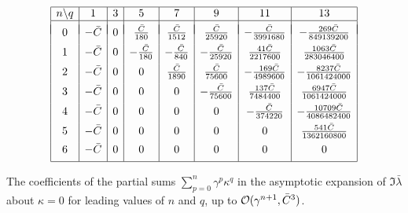 \documentclass[12pt,a5paper]{article}
\begin{document}
\begin{table}
\centering
\[
\begin{array}{|c|c|c|c|c|c|c|c|}
\hline
n\backslash q & 1 & 3 & 5 & 7 & 9 & 11 & 13\\
\hline
&&&&&&&\\[-2ex]
0 & -\bar{C} & 0 & \frac{\bar{C}}{180} & \frac{\bar{C}}{1512} & \frac{\bar{C}}{25920}
   & -\frac{\bar{C}}{3991680} & -\frac{269\bar{C}}{849139200}
\\[1ex]
1 & -\bar{C} & 0 & -\frac{\bar{C}}{180} & -\frac{\bar{C}}{840} & -\frac{\bar{C}}{25920}
   & \frac{41\bar{C}}{2217600} & \frac{1063\bar{C}}{283046400}
\\[1ex]
2 & -\bar{C} & 0 & 0 & \frac{\bar{C}}{1890} & \frac{\bar{C}}{75600}
   & -\frac{169\bar{C}}{4989600} & -\frac{8237\bar{C}}{1061424000}
\\[1ex]
3 & -\bar{C} & 0 & 0 & 0 & -\frac{\bar{C}}{75600}
   & \frac{137\bar{C}}{7484400} & \frac{6947\bar{C}}{1061424000}
\\[1ex]
4 & -\bar{C} & 0 & 0 & 0 & 0
   & -\frac{\bar{C}}{374220} & -\frac{10709\bar{C}}{4086482400}
\\[1ex]
5 & -\bar{C} & 0 & 0 & 0 & 0 & 0 & \frac{541\bar{C}}{1362160800}
\\[1ex]
6 & -\bar{C} & 0 & 0 & 0 & 0 & 0 & 0
\\[1ex]
\hline
\end{array}
\]
\caption{The coefficients of the partial sums $\sum_{p=0}^{n}\gamma^p\kappa^q$ in the 
asymptotic expansion of $\Im\bar{\lambda}$ about $\kappa=0$ 
for leading values of $n$ and $q$, up to ${\cal O}(\gamma^{n+1},\bar{C}^3)$.}
\label{tab:partial:kappa:im}
\end{table}
\end{document}
